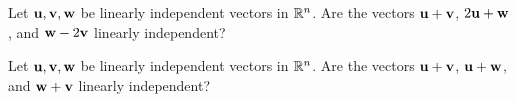 \begin{enumialphparenastyle}
\begin{ex}
  Let $\mbox{\bf u},\mbox{\bf v},\mbox{\bf w}$ be linearly independent vectors in
  $\mathbb{R}^n$. Are the vectors $\mbox{\bf u}+\mbox{\bf v}$, $2\mbox{\bf u}+\mbox{\bf w}$,
  and $\mbox{\bf w}-2\mbox{\bf v}$ linearly independent?
\end{ex}

\begin{ex}
  Let $\mbox{\bf u},\mbox{\bf v},\mbox{\bf w}$ be linearly independent vectors in
  $\mathbb{R}^n$. Are the vectors $\mbox{\bf u}+\mbox{\bf v}$, $\mbox{\bf u}+\mbox{\bf w}$,
  and $\mbox{\bf w}+\mbox{\bf v}$ linearly independent?
\end{ex}

\end{enumialphparenastyle}
